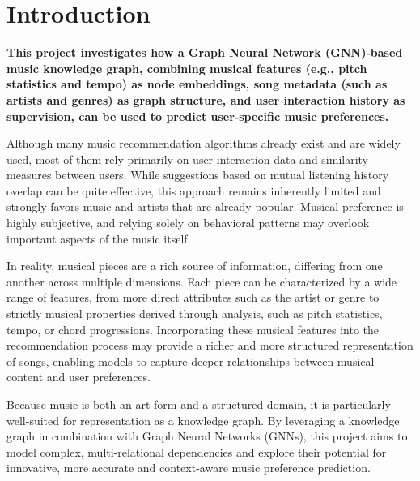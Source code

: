 \section{Introduction}
\label{sec:intro}
\textbf{This project investigates how a Graph Neural Network (GNN)-based music knowledge graph, combining musical features (e.g., pitch statistics and tempo) as node embeddings, song metadata (such as artists and genres) as graph structure, and user interaction history as supervision, can be used to predict user-specific music preferences.}

Although many music recommendation algorithms already exist and are widely used, most of them rely primarily on user interaction data and similarity measures between users. While suggestions based on mutual listening history overlap can be quite effective, this approach remains inherently limited and strongly favors music and artists that are already popular. Musical preference is highly subjective, and relying solely on behavioral patterns may overlook important aspects of the music itself.

In reality, musical pieces are a rich source of information, differing from one another across multiple dimensions. Each piece can be characterized by a wide range of features, from more direct attributes such as the artist or genre to strictly musical properties derived through analysis, such as pitch statistics, tempo, or chord progressions. Incorporating these musical features into the recommendation process may provide a richer and more structured representation of songs, enabling models to capture deeper relationships between musical content and user preferences.

Because music is both an art form and a structured domain, it is particularly well-suited for representation as a knowledge graph. By leveraging a knowledge graph in combination with Graph Neural Networks (GNNs), this project aims to model complex, multi-relational dependencies and explore their potential for innovative,  more accurate and context-aware music preference prediction.

